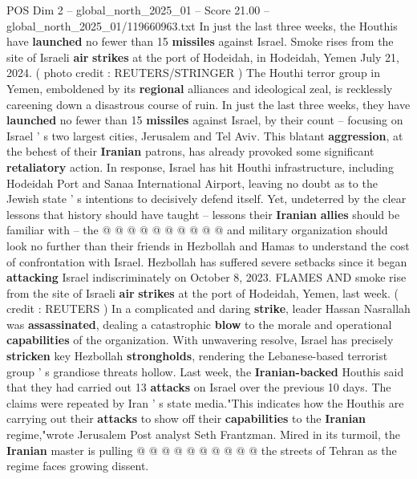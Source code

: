 \begin{textsample}{POS Dim 2 – global\_north\_2025\_01 – Score 21.00 – global\_north\_2025\_01/119660963.txt}  \label{ex:f2_pos_394}
In just the last three weeks, the Houthis have \textbf{launched} no fewer than 15 \textbf{missiles} against Israel.
Smoke rises from the site of Israeli \textbf{air} \textbf{strikes} at the port of Hodeidah, in Hodeidah, Yemen July 21, 2024. ( photo credit : REUTERS/STRINGER ) The Houthi terror group in Yemen, emboldened by its \textbf{regional} alliances and ideological zeal, is recklessly careening down a disastrous course of ruin.
In just the last three weeks, they have \textbf{launched} no fewer than 15 \textbf{missiles} against Israel, by their count -- focusing on Israel ' s two largest cities, Jerusalem and Tel Aviv.
This blatant \textbf{aggression}, at the behest of their \textbf{Iranian} patrons, has already provoked some significant \textbf{retaliatory} action.
In response, Israel has hit Houthi infrastructure, including Hodeidah Port and Sanaa International Airport, leaving no doubt as to the Jewish state ' s intentions to decisively defend itself.
Yet, undeterred by the clear lessons that history should have taught -- lessons their \textbf{Iranian} \textbf{allies} should be familiar with -- the @ @ @ @ @ @ @ @ @ @ and military organization should look no further than their friends in Hezbollah and Hamas to understand the cost of confrontation with Israel.
Hezbollah has suffered severe setbacks since it began \textbf{attacking} Israel indiscriminately on October 8, 2023.
FLAMES AND smoke rise from the site of Israeli \textbf{air} \textbf{strikes} at the port of Hodeidah, Yemen, last week. ( credit : REUTERS ) In a complicated and daring \textbf{strike}, leader Hassan Nasrallah was \textbf{assassinated}, dealing a catastrophic \textbf{blow} to the morale and operational \textbf{capabilities} of the organization.
With unwavering resolve, Israel has precisely \textbf{stricken} key Hezbollah \textbf{strongholds}, rendering the Lebanese-based terrorist group ' s grandiose threats hollow.
Last week, the \textbf{Iranian-backed} Houthis said that they had carried out 13 \textbf{attacks} on Israel over the previous 10 days.
The claims were repeated by Iran ' s state media."This indicates how the Houthis are carrying out their \textbf{attacks} to show off their \textbf{capabilities} to the \textbf{Iranian} regime,"wrote Jerusalem Post analyst Seth Frantzman.
Mired in its turmoil, the \textbf{Iranian} master is pulling @ @ @ @ @ @ @ @ @ @ the streets of Tehran as the regime faces growing dissent.

\end{textsample}
